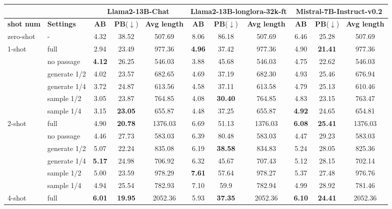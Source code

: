 \begin{table*}[t]
\renewcommand\arraystretch{1.1}
\setlength{\tabcolsep}{4pt}
\centering
\small
\begin{tabular}{l|l|ccc|ccc|ccc}
\bottomrule
  \multicolumn{2}{l}{} & \multicolumn{3}{c}{\textbf{Llama2-13B-Chat}} &\multicolumn{3}{c}{\textbf{Llama2-13B-longlora-32k-ft}} & \multicolumn{3}{c}{\textbf{Mistral-7B-Instruct-v0.2}} \\
\hline
\textbf{shot num} & \textbf{Settings} & \textbf{AB} & \textbf{PB}($\downarrow$) & \textbf{Avg length} & \textbf{AB} & \textbf{PB}($\downarrow$) & \textbf{Avg length} & \textbf{AB} & \textbf{PB}($\downarrow$) & \textbf{Avg length}\\
\hline
zero-shot & - & 4.32 & 38.52 & 507.69 & 8.06 & 86.18 & 507.69 & 6.46 & 25.28 & 507.69 \\
\hline
1-shot & full & 2.94 & 23.49 & 977.36 & \textbf{4.96} & 37.42 & 977.36 & 4.90 & \textbf{21.41} & 977.36\\
 & no passage & \textbf{4.12} & 26.25 & 546.03 & 3.88 & 45.68 & 546.03 & 4.75 & 22.62 & 546.03\\
 & generate 1/2 & 4.02 & 23.57 & 682.65 & 4.69 & 37.19 & 682.30 & 4.93 & 25.46  & 676.94\\
 & generate 1/4 & 3.72 & 24.87 & 613.56 & 4.58 & 37.11 & 613.58 & 4.79 & 25.13 & 610.46\\
 & sample 1/2 & 3.05 & 23.87 & 764.85 & 4.08 & \textbf{30.40} & 764.85 & 4.83 & 23.15 & 763.47\\
 & sample 1/4 & 3.15 & \textbf{23.05} & 655.87 & 4.48 & 37.25 & 655.87 & \textbf{4.92} & 24.65 & 654.81
\\
\hline
2-shot & full & 4.90 & \textbf{20.78} & 1376.03 & 6.69 & 51.13 & 1376.03 & \textbf{6.08} & \textbf{25.41} & 1376.03\\
 & no passage & 4.46 & 27.73 & 583.03 & 6.39 & 80.48 & 583.03 & 4.47 & 29.23 & 583.03\\
 & generate 1/2 & 5.07 & 22.24 & 835.08 & 6.19 & \textbf{38.58} & 834.83 & 5.24 & 28.05 & 825.36 \\
 & generate 1/4 & \textbf{5.17} & 24.98 & 706.92 & 6.32 & 45.67 & 707.43 & 5.12 & 28.15 & 702.14\\
 & sample 1/2 & 5.00 & 23.59& 978.29 & \textbf{7.61} & 57.64 & 978.27 & 5.37 & 27.48 & 976.76\\
 & sample 1/4 & 4.94 & 25.54 & 782.93 & 7.10 & 59.9 & 782.94 & 4.99 & 28.92 & 781.46\\
\hline
4-shot & full & \textbf{6.01} & \textbf{19.95} & 2052.36 & 5.93 & \textbf{37.35} & 2052.36 & \textbf{6.10} & \textbf{24.41} & 2052.36 \\

\end{tabular}
\end{table*}
